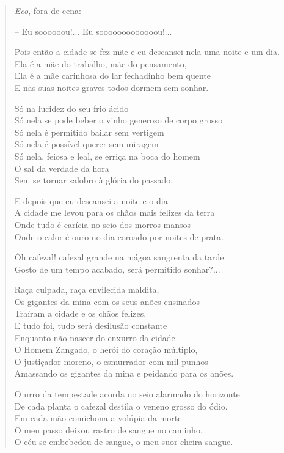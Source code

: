\begin{verse}
\quad\quad\emph{Eco}, fora de cena:

\quad\quad\quad\quad{}-- Eu soooooou!... Eu sooooooooooooou!...

Pois então a cidade se fez mãe e eu descansei nela uma noite e um dia.\\
Ela é a mãe do trabalho, mãe do pensamento,\\
Ela é a mãe carinhosa do lar fechadinho bem quente\\
E nas suas noites graves todos dormem sem sonhar.

Só na lucidez do seu frio ácido\\
Só nela se pode beber o vinho generoso de corpo grosso\\
Só nela é permitido bailar sem vertigem\\
Só nela é possível querer sem miragem\\
Só nela, feiosa e leal, se erriça na boca do homem\\
O sal da verdade da hora\\
Sem se tornar salobro à glória do passado.

E depois que eu descansei a noite e o dia\\
A cidade me levou para os chãos mais felizes da terra\\
Onde tudo é carícia no seio dos morros mansos\\
Onde o calor é ouro no dia coroado por noites de prata.

Ôh cafezal! cafezal grande na mágoa sangrenta da tarde\\
Gosto de um tempo acabado, será permitido sonhar?...

Raça culpada, raça envilecida maldita,\\
Os gigantes da mina com os seus anões ensinados\\
Traíram a cidade e os chãos felizes.\\
E tudo foi, tudo será desilusão constante\\
Enquanto não nascer do enxurro da cidade\\
O Homem Zangado, o herói do coração múltiplo,\\
O justiçador moreno, o esmurrador com mil punhos\\
Amassando os gigantes da mina e peidando para os anões.

O urro da tempestade acorda no seio alarmado do horizonte\\
De cada planta o cafezal destila o veneno grosso do ódio.\\
Em cada mão comichona a volúpia da morte.\\
O meu passo deixou rastro de sangue no caminho,\\
O céu se embebedou de sangue, o meu suor cheira sangue.


\end{verse}
